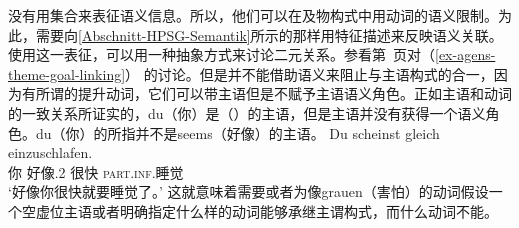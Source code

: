  \citet{MR2001a} 没有用集合来表征语义信息。所以，他们可以在及物构式中用动词的语义限制。为此，需要向\ref{Abschnitt-HPSG-Semantik}所示的那样用特征描述来反映语义关联。使用这一表征，可以用一种抽象方式来讨论二元关系。参看第~\pageref{ex-agens-theme-goal-linking}页对（\ref{ex-agens-theme-goal-linking}） 的讨论。但是并不能借助语义来阻止与主语构式的合一，因为有所谓的提升动词，它们可以带主语但是不赋予主语语义角色。正如主语和动词的一致关系所证实的，du（你）是（）的主语，但是主语并没有获得一个语义角色。du（你）的所指并不是seems（好像）的主语。
\ea
\gll Du scheinst gleich einzuschlafen.\\
     你 好像.2\sg{} 很快 \textsc{part}.\textsc{inf}.睡觉\\
\glt `好像你很快就要睡觉了。'
\z
这就意味着需要或者为像grauen（害怕）的动词假设一个空虚位主语或者明确指定什么样的动词能够承继主谓构式，而什么动词不能。

